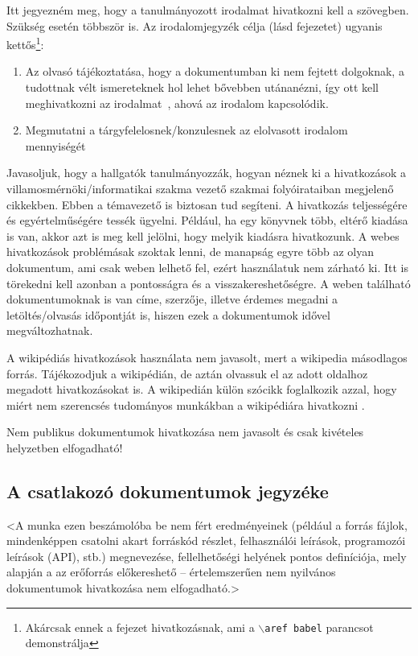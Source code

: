 \documentclass[a4paper,oneside]{article}
\begin{document}
Itt jegyezném meg, hogy a tanulmányozott irodalmat hivatkozni kell a
szövegben.  Szükség esetén többször is.  Az irodalomjegyzék célja
(lásd  fejezetet) ugyanis
kettős\footnote{Akárcsak ennek a fejezet hivatkozásnak, ami a
  \texttt{$\backslash$aref babel} parancsot demonstrálja}:
\begin{enumerate}
\item Az olvasó tájékoztatása, hogy a dokumentumban ki nem fejtett
  dolgoknak, a tudottnak vélt ismereteknek hol lehet bővebben
  utánanézni, így ott kell meghivatkozni az irodalmat~\cite{eco,
    esterhazy}, ahová az irodalom kapcsolódik.
\item Megmutatni a tárgyfelelosnek/konzulesnek az elolvasott irodalom
  mennyiségét
\end{enumerate}

Javasoljuk, hogy a hallgatók tanulmányozzák, hogyan néznek ki a
hivatkozások a villamosmérnöki/informatikai szakma vezető szakmai
folyóirataiban megjelenő cikkekben.  Ebben a témavezető is biztosan
tud segíteni.  A hivatkozás teljességére és egyértelműségére tessék
ügyelni.  Például, ha egy könyvnek több, eltérő kiadása is van, akkor
azt is meg kell jelölni, hogy melyik kiadásra hivatkozunk.  A webes
hivatkozások problémásak szoktak lenni, de manapság egyre több az
olyan dokumentum, ami csak weben lelhető fel, ezért használatuk nem
zárható ki. Itt is törekedni kell azonban a pontosságra és a
visszakereshetőségre. A weben található dokumentumoknak is van címe,
szerzője, illetve érdemes megadni a letöltés/olvasás időpontját is,
hiszen ezek a dokumentumok idővel megváltozhatnak.

A wikipédiás hivatkozások használata nem javasolt, mert a wikipedia
másodlagos forrás.  Tájékozodjuk a wikipédián, de aztán olvassuk el az
adott oldalhoz megadott hivatkozásokat is.  A wikipedián külön szócikk
foglalkozik azzal, hogy miért nem szerencsés tudományos munkákban a
wikipédiára hivatkozni \cite{wikipedia}.

Nem publikus dokumentumok hivatkozása nem javasolt és csak kivételes
helyzetben elfogadható!

\subsection{A csatlakozó dokumentumok jegyzéke}
\label{sec:csat-irod}

<A munka ezen beszámolóba be nem fért eredményeinek (például a forrás
fájlok, mindenképpen csatolni akart forráskód részlet, felhasználói
leírások, programozói leírások (API), stb.) megnevezése,
fellelhetőségi helyének pontos definíciója, mely alapján a az
erőforrás előkereshető -- értelemszerűen nem nyilvános dokumentumok
hivatkozása nem elfogadható.>
\end{document}
